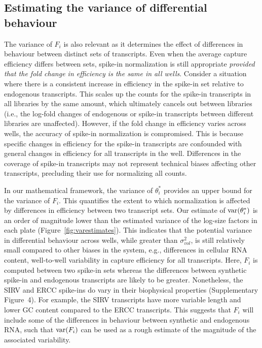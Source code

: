 \documentclass{article}
\newcommand{\suppfigbiophys}{4}
\begin{document}
\subsection{Estimating the variance of differential behaviour}
The variance of $F_i$ is also relevant as it determines the effect of differences in behaviour between distinct sets of transcripts.
Even when the average capture efficiency differs between sets, spike-in normalization is still appropriate \textit{provided that the fold change in efficiency is the same in all wells}.
Consider a situation where there is a consistent increase in efficiency in the spike-in set relative to endogenous transcripts.
This scales up the counts for the spike-in transcripts in all libraries by the same amount, which ultimately cancels out between libraries (i.e., the log-fold changes of endogenous or spike-in transcripts between different libraries are unaffected).
However, if the fold change in efficiency varies across wells, the accuracy of spike-in normalization is compromised.
This is because specific changes in efficiency for the spike-in transcripts are confounded with general changes in efficiency for all transcripts in the well.
Differences in the coverage of spike-in transcripts may not represent technical biases affecting other transcripts, precluding their use for normalizing all counts.

In our mathematical framework, the variance of $\theta^*_i$ provides an upper bound for the variance of $F_i$.
This quantifies the extent to which normalization is affected by differences in efficiency between two transcript sets.
Our estimate of $\mbox{var}(\theta^*_i)$ is an order of magnitude lower than the estimated variance of the log-size factors in each plate (Figure~\ref{fig:varestimates}).
This indicates that the potential variance in differential behaviour across wells, while greater than $\sigma^2_{vol}$, is still relatively small compared to other biases in the system, e.g., differences in cellular RNA content, well-to-well variability in capture efficiency for all transcripts.
Here, $F_i$ is computed between two spike-in sets whereas the differences between synthetic spike-in and endogenous transcripts are likely to be greater.
Nonetheless, the SIRV and ERCC spike-ins do vary in their biophysical properties (Supplementary Figure~\suppfigbiophys{}).
For example, the SIRV transcripts have more variable length and lower GC content compared to the ERCC transcripts.
This suggests that $F_i$ will include some of the differences in behaviour between synthetic and endogenous RNA, such that $\mbox{var}(F_i)$ can be used as a rough estimate of the magnitude of the associated variability.
\end{document}
